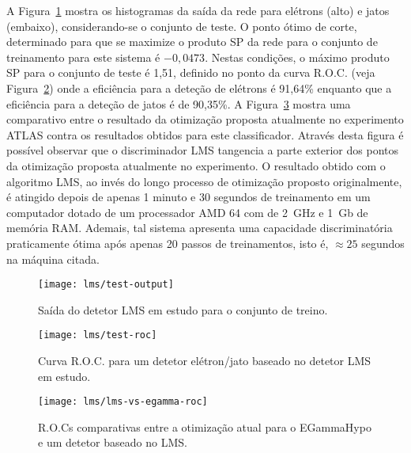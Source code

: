 A Figura~\ref{fig:lms-test-output} mostra os histogramas da saída da rede para
elétrons (alto) e jatos (embaixo), considerando-se o conjunto de teste. O
ponto ótimo de corte, determinado para que se maximize o produto SP da rede
para o conjunto de treinamento para este sistema é $-0,0473$. Nestas
condições, o máximo produto SP para o conjunto de teste é 1,51, definido no
ponto da curva R.O.C. (veja Figura~\ref{fig:lms-test-roc}) onde a eficiência
para a deteção de elétrons é 91,64\% enquanto que a eficiência para a deteção
de jatos é de 90,35\%. A Figura~\ref{fig:lms-vs-egamma-roc} mostra uma
comparativo entre o resultado da otimização proposta atualmente no experimento
ATLAS contra os resultados obtidos para este classificador. Através desta
figura é possível observar que o discriminador LMS tangencia a parte exterior
dos pontos da otimização proposta atualmente no experimento. O resultado
obtido com o algoritmo LMS, ao invés do longo processo de otimização proposto
originalmente, é atingido depois de apenas 1 minuto e 30 segundos de
treinamento em um computador dotado de um processador AMD 64 com 
de 2~GHz e 1~Gb de memória RAM. Ademais, tal sistema apresenta uma capacidade
discriminatória praticamente ótima após apenas 20 passos de treinamentos, isto
é, $\approx 25$ segundos na máquina citada.

\begin{figure}
\begin{center}
\texttt{[image: lms/test-output]}
\end{center}
\caption{Saída do detetor LMS em estudo para o conjunto de treino.}
\label{fig:lms-test-output}
\end{figure}

\begin{figure}
\begin{center}
\texttt{[image: lms/test-roc]}
\end{center}
\caption{Curva R.O.C. para um detetor elétron/jato baseado no detetor LMS em
estudo.}
\label{fig:lms-test-roc}
\end{figure}

\begin{figure}
\begin{center}
\texttt{[image: lms/lms-vs-egamma-roc]}
\end{center}
\caption{R.O.Cs comparativas entre a otimização atual para o EGammaHypo e um
detetor baseado no LMS.}
\label{fig:lms-vs-egamma-roc}
\end{figure}

